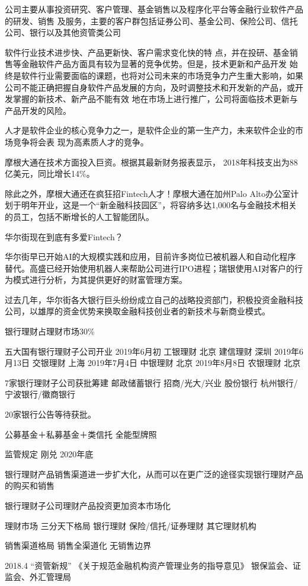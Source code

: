 \documentclass[letterpaper,12pt,english]{sphinxmanual}
\begin{document}
公司主要从事投资研究、客户管理、基金销售以及程序化平台等金融行业软件产品的研发、销售 及服务，主要的客户群包括证券公司、基金公司、保险公司、信托公司、银行以及其他资管类公司

软件行业技术进步快、产品更新快、客户需求变化快的特 点，并在投研、基金销售等金融软件产品方面具有较为显著的竞争优势。但是，技术更新和产品开发 始终是软件行业需要面临的课题，也将对公司未来的市场竞争力产生重大影响，如果公司不能正确把握自身软件产品发展的方向，及时调整技术和开发新的产品，或开发掌握的新技术、新产品不能有效
地在市场上进行推广，公司将面临技术更新与产品开发的风险。

人才是软件企业的核心竞争力之一，是软件企业的第一生产力，未来软件企业的市场竞争将会表 现为高素质人才的竞争。

摩根大通在技术方面投入巨资。根据其最新财务报表显示，
2018年科技支出为88亿美元，同比增长14\%。

除此之外，摩根大通还在疯狂招Fintech人才！摩根大通在加州Palo Alto办公室计划于明年开业，这是一个“新金融科技园区”，将容纳多达1,000名与金融技术相关的员工，包括不断增长的人工智能团队。

华尔街现在到底有多爱Fintech？

华尔街早已开始AI的大规模实践和应用，目前许多岗位已被机器人和自动化程序替代。高盛已经开始使用机器人来帮助公司进行IPO进程；瑞银使用AI对客户的行为模式进行分析，为其提供更好的财富管理方案。

过去几年，华尔街各大银行巨头纷纷成立自己的战略投资部门，积极投资金融科技公司，以雄厚的资金优势来换取金融科技创业者的新技术与新商业模式。

银行理财占理财市场30\%

五大国有银行理财子公司开业
2019年6月初
工银理财 北京
建信理财 深圳
2019年6月13日
交银理财 上海
2019年7月4日
中银理财 北京
2019年8月8日
农银理财 北京

7家银行理财子公司获批筹建
邮政储蓄银行
招商/光大/兴业 股份银行
杭州银行/宁波银行/徽商银行

20家银行公告等待获批。

公募基金＋私募基金＋类信托 全能型牌照

监管规定 刚兑 2020年底

银行理财产品销售渠道进一步扩大化，从而可以在更广泛的途径实现银行理财产品的购买和销售

银行理财子公司理财产品投资更加资本市场化

理财市场 三分天下格局 银行理财 保险/信托/证券理财 其它理财机构

销售渠道格局 销售全渠道化 无销售边界

2018.4 “资管新规”
《关于规范金融机构资产管理业务的指导意见》
银保监会、证监会、外汇管理局
\end{document}

